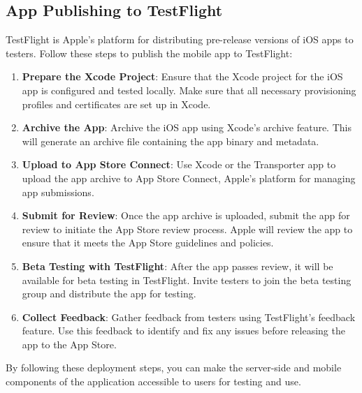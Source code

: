 \documentclass[
  biblatex,
  language=english,
  figures=false,
  sourcecodes,
  glossaries,
  index
]{kidiplom}
\begin{document}
\subsection{App Publishing to TestFlight}

TestFlight is Apple's platform for distributing pre-release versions of iOS apps to testers. Follow these steps to publish the mobile app to TestFlight:

\begin{enumerate}
    \item \textbf{Prepare the Xcode Project}: Ensure that the Xcode project for the iOS app is configured and tested locally. Make sure that all necessary provisioning profiles and certificates are set up in Xcode.
    
    \item \textbf{Archive the App}: Archive the iOS app using Xcode's archive feature. This will generate an archive file containing the app binary and metadata.
    
    \item \textbf{Upload to App Store Connect}: Use Xcode or the Transporter app to upload the app archive to App Store Connect, Apple's platform for managing app submissions.
    
    \item \textbf{Submit for Review}: Once the app archive is uploaded, submit the app for review to initiate the App Store review process. Apple will review the app to ensure that it meets the App Store guidelines and policies.
    
    \item \textbf{Beta Testing with TestFlight}: After the app passes review, it will be available for beta testing in TestFlight. Invite testers to join the beta testing group and distribute the app for testing.
    
    \item \textbf{Collect Feedback}: Gather feedback from testers using TestFlight's feedback feature. Use this feedback to identify and fix any issues before releasing the app to the App Store.
\end{enumerate}

By following these deployment steps, you can make the server-side and mobile components of the application accessible to users for testing and use.
\end{document}
